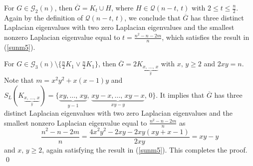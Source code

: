 \documentclass[12pt]{article}
\newenvironment{pf}{\medskip\noindent{Proof:  \hspace*{-.4cm}}
       \enspace}{\hfill \qed \newline \medskip}
\begin{document}
\begin{pf}
 For $G\in \mathcal{G}_2(n)$, then $\overline{G}=K_t\cup H$, where
 $H\in \mathcal{Q}(n-t,\,t)$ with $2\leq t\leq \frac{n}{2}$. Again
 by the definition of $\mathcal{Q}(n-t,\,t)$, we conclude that $\overline{G}$ has three distinct
 Laplacian eigenvalues with two zero Laplacian eigenvalues and the
 smallest nonzero Laplacian eigenvalue equal to
 $t=\frac{n^2-n-2m}{n}$, which satisfies the result in (\ref{sunm5}).

  For $G\in \mathcal{G}_3(n)\setminus \{\frac{n}{2}K_1\vee \frac{n}{2}K_1\}$, then
  $\overline{G}=2K_{\underbrace{x,\,\ldots,\,x}_y}$ with $x,\,y\geq 2$ and
  $2xy=n$. Note that $m=x^2y^2+x(x-1)y$ and
  $S_L(K_{\underbrace{x,\,\ldots,\,x}_y})=\{\underbrace{xy,\ldots,\,xy}_{y-1},\,\underbrace{xy-x,\ldots,\,xy-x}_{xy-y},\,0\}$.
 It implies that $\overline{G}$ has three distinct
 Laplacian eigenvalues with two zero Laplacian eigenvalues and the
 smallest nonzero Laplacian eigenvalue equal to
 $\frac{n^2-n-2m}{n}$ as
 $$\frac{n^2-n-2m}{n}=\frac{4x^2y^2-2xy-2xy(xy+x-1)}{2xy}=xy-y$$ 
 and $x,\,y\geq 2$, again satisfying the result in (\ref{sunm5}). This completes
 the proof.
\end{pf}
\end{document}
